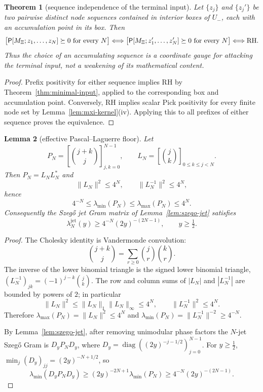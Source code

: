 \documentclass[11pt]{amsart}
\newtheorem{theorem}{Theorem}[section]
\newtheorem{lemma}[theorem]{Lemma}
\theoremstyle{definition}
\theoremstyle{remark}
\theoremstyle{definition}
\newcommand{\half}{\tfrac{1}{2}}
\DeclareMathOperator{\diag}{diag}
\begin{document}
\begin{theorem}[sequence independence of the terminal input]\label{thm:sequence-gauge}
Let $\{z_j\}$ and $\{z_j'\}$ be two pairwise distinct node sequences contained in interior boxes of
$U_-$, each with an accumulation point in its box.  Then
\[
   \bigl[\mathsf P[M_\Xi;z_1,\ldots,z_N]\succeq0\ \textnormal{for every }N\bigr]
   \Longleftrightarrow
   \bigl[\mathsf P[M_\Xi;z_1',\ldots,z_N']\succeq0\ \textnormal{for every }N\bigr]
   \Longleftrightarrow
   \mathrm{RH}.
\]
Thus the choice of an accumulating sequence is a coordinate gauge for attacking the terminal input, not
a weakening of its mathematical content.
\end{theorem}

\begin{proof}
Prefix positivity for either sequence implies RH by Theorem~\ref{thm:minimal-input}, applied to the
corresponding box and accumulation point.  Conversely, RH implies scalar Pick positivity for every finite
node set by Lemma~\ref{lem:mxi-kernel}(iv).  Applying this to all prefixes of
either sequence proves the equivalence.
\end{proof}

\begin{lemma}[effective Pascal--Laguerre floor]\label{lem:pascal-effective}
Let
\[
   P_N=\left[\binom{j+k}{j}\right]_{j,k=0}^{N-1},
   \qquad
   L_N=\left[\binom{j}{k}\right]_{0\le k\le j<N}.
\]
Then $P_N=L_NL_N^*$ and
\[
   \|L_N\|^2\le4^N,\qquad \|L_N^{-1}\|^2\le4^N,
\]
hence
\[
   4^{-N}\le\lambda_{\min}(P_N)\le\lambda_{\max}(P_N)\le4^N .
\]
Consequently the Szeg\H{o} jet Gram matrix of Lemma~\ref{lem:szego-jet} satisfies
\[
   \lambda_N^{\mathrm{jet}}(y)\ge4^{-N}(2y)^{-(2N-1)},\qquad y\ge\half .
\]
\end{lemma}

\begin{proof}
The Cholesky identity is Vandermonde convolution:
\[
   \binom{j+k}{j}=\sum_{r\ge0}\binom{j}{r}\binom{k}{r}.
\]
The inverse of the lower binomial triangle is the signed lower binomial triangle,
$(L_N^{-1})_{jk}=(-1)^{j-k}\binom{j}{k}$.  The row and column sums of $|L_N|$ and $|L_N^{-1}|$ are
bounded by powers of $2$; in particular
\[
   \|L_N\|^2\le\|L_N\|_1\|L_N\|_\infty\le4^N,
   \qquad
   \|L_N^{-1}\|^2\le4^N .
\]
Therefore
$\lambda_{\max}(P_N)=\|L_N\|^2\le4^N$ and
$\lambda_{\min}(P_N)=\|L_N^{-1}\|^{-2}\ge4^{-N}$.

By Lemma~\ref{lem:szego-jet}, after removing unimodular phase factors the $N$-jet Szeg\H{o} Gram is
$D_yP_ND_y$, where $D_y=\diag((2y)^{-j-1/2})_{j=0}^{N-1}$.  For $y\ge\half$,
$\min_j(D_y)_{jj}=(2y)^{-N+1/2}$, so
\[
   \lambda_{\min}(D_yP_ND_y)
   \ge (2y)^{-2N+1}\lambda_{\min}(P_N)
   \ge4^{-N}(2y)^{-(2N-1)}.
\]
\end{proof}
\end{document}
